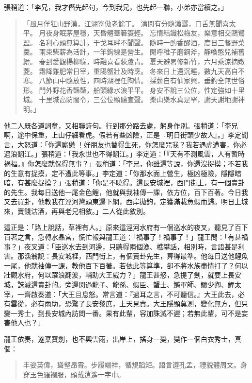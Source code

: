 張稍道：「李兄，我才僭先起句，今到我兄，也先起一聯，小弟亦當續之。」
\begin{quote}
「風月佯狂山野漢，江湖寄傲老餘丁。
清閑有分隨瀟灑，口舌無聞喜太平。
月夜身眠茅屋穩，天昏體蓋箬簑輕。
忘情結識松梅友，樂意相交鷗鷺盟。
名利心頭無算計，干戈耳畔不聞聲。
隨時一酌香醪酒，度日三餐野菜羹。
兩束柴薪為活計，一竿鉤線是營生。
閑呼稚子磨鋼斧，靜喚憨兒補舊繒。
春到愛觀楊柳綠，時融喜看荻蘆青。
夏天避暑修新竹，六月乘涼摘嫩菱。
霜降雞肥常日宰，重陽蟹壯及時烹。
冬來日上還沉睡，數九天高自不寒。
八節山中隨放性，四時湖裡任陶情。
採薪自有仙家興，垂釣全無世俗形。
門外野花香豔豔，船頭綠水浪平平。
身安不說三公位，性定強如十里城。
十里城高防閫令，三公位顯聽宣聲。
樂山樂水真是罕，謝天謝地謝神明。」
\end{quote}

他二人既各道詞章，又相聯詩句。行到那分路去處，躬身作別。張稍道：「李兄啊，途中保重，上山仔細看虎。假若有些凶險，正是『明日街頭少故人』。」李定聞言，大怒道：「你這廝憊𪬯！好朋友也替得生死，你怎麼咒我？我若遇虎遭害，你必遇浪翻江。」張稍道：「我永世也不得翻江。」李定道：「『天有不測風雲，人有暫時禍福。』你怎麼就保得無事？」張稍道：「李兄，你雖這等說，你還沒捉摸；不若我的生意有捉摸，定不遭此等事。」李定道：「你那水面上營生，極凶極險，隱隱暗暗，有甚麼捉摸？」張稍道：「你是不曉得。這長安城裡，西門街上，有一個賣卦的先生。我每日送他一尾金色鯉，他就與我袖傳一課，依方位，百下百著。今日我又去買卦，他教我在涇河灣頭東邊下網，西岸拋鉤，定獲滿載魚蝦而歸。明日上城來，賣錢沽酒，再與老兄相敘。」二人從此敘別。

這正是：「路上說話，草裡有人。」原來這涇河水府有一個巡水的夜叉，聽見了百下百著之言，急轉水晶宮，慌忙報與龍王道：「禍事了！禍事了！」龍王問：「有甚禍事？」夜叉道：「臣巡水去到河邊，只聽得兩個漁、樵攀話，相別時，言語甚是利害。那漁翁說：長安城裡，西門街上，有個賣卦先生，算得最準。他每日送他鯉魚一尾，他就袖傳一課，教他百下百著。若依此等算準，卻不將水族盡情打了？何以壯觀水府，何以躍浪翻波，輔助大王威力？」龍王甚怒，急提了劍，就要上長安城，誅滅這賣卦的。旁邊閃過龍子、龍孫、蝦臣、蟹士、鰣軍師、鱖少卿、鯉太宰，一齊啟奏道：「大王且息怒。常言道：『過耳之言，不可聽信。』大王此去，必有雲從，必有雨助，恐驚了長安黎庶，上天見責。大王隱顯莫測，變化無方，但只變一秀士，到長安城內訪問一番。果有此輩，容加誅滅不遲；若無此輩，可不是妄害他人也？」

龍王依奏，遂棄寶劍，也不興雲雨，出岸上，搖身一變，變作一個白衣秀士，真個：
\begin{quote}
丰姿英偉，聳壑昂霄。步履端祥，循規蹈矩。語言遵孔孟，禮貌體周文。身穿玉色羅襴服，頭戴逍遙一字巾。
\end{quote}

